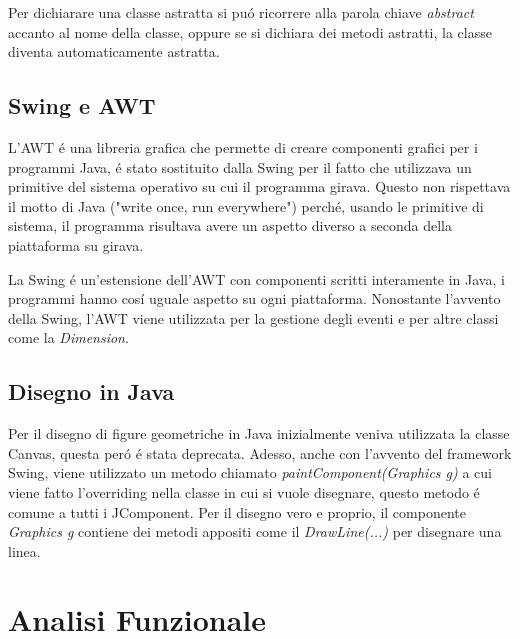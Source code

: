 \documentclass[a4paper,12pt]{article}
\begin{document}
Per dichiarare una classe astratta si puó ricorrere alla parola chiave \textit{abstract} accanto al nome della classe, oppure se si dichiara dei metodi astratti, la classe diventa automaticamente astratta.
\textcite{astratta}

\subsection{Swing e AWT}
L'AWT é una libreria grafica che permette di creare componenti grafici per i programmi Java, é stato sostituito dalla Swing per il fatto che utilizzava un primitive del sistema operativo su cui il programma girava. Questo non rispettava il motto di Java ("write once, run everywhere") perché, usando le primitive di sistema, il programma risultava avere un aspetto diverso a seconda della piattaforma su girava.

La Swing é un'estensione dell'AWT con componenti scritti interamente in Java, i programmi hanno cosí uguale aspetto su ogni piattaforma. Nonostante l'avvento della Swing, l'AWT viene utilizzata per la gestione degli eventi e per altre classi come la \textit{Dimension}.

\subsection{Disegno in Java}
Per il disegno di figure geometriche in Java inizialmente veniva utilizzata la classe Canvas, questa peró é stata deprecata. Adesso, anche con l'avvento del framework Swing, viene utilizzato un metodo chiamato \textit{paintComponent(Graphics g)} a cui viene fatto l'overriding nella classe in cui si vuole disegnare, questo metodo é comune a tutti i JComponent. Per il disegno vero e proprio, il componente \textit{Graphics g} contiene dei metodi appositi come il \textit{DrawLine(...)} per disegnare una linea. 

\section{Analisi Funzionale}
\end{document}
